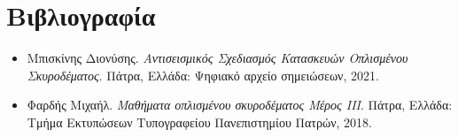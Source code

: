 \pagestyle{plain}
\chapter*{Βιβλιογραφία}
\renewcommand{\labelitemi}{$\blacksquare$}
\begin{itemize}
  \item Μπισκίνης Διονύσης. \emph{Αντισεισμικός Σχεδιασμός Κατασκευών Οπλισμένου Σκυροδέματος}. Πάτρα, Ελλάδα: Ψηφιακό αρχείο σημειώσεων, 2021.
  \item Φαρδής Μιχαήλ. \emph{Μαθήματα οπλισμένου σκυροδέματος Μέρος ΙΙΙ}. Πάτρα, Ελλάδα: Τμήμα Εκτυπώσεων Τυπογραφείου Πανεπιστημίου Πατρών, 2018.
\end{itemize}
